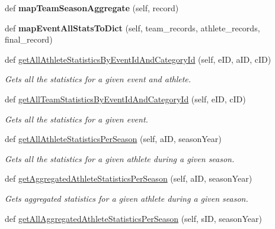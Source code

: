 \begin{DoxyCompactItemize}
def {\bfseries map\+Team\+Season\+Aggregate} (self, record)
\item 
\mbox{\label{classhandler_1_1match__based__event_1_1_match_based_event_handler_a0207233b2c98b5d0b2caffb3b8306700}} 
def {\bfseries map\+Event\+All\+Stats\+To\+Dict} (self, team\+\_\+records, athlete\+\_\+records, final\+\_\+record)
\item 
def \hyperlink{classhandler_1_1match__based__event_1_1_match_based_event_handler_a80e0ef9c6ac143b78ab200c0e84511d9}{get\+All\+Athlete\+Statistics\+By\+Event\+Id\+And\+Category\+Id} (self, e\+ID, a\+ID, c\+ID)
\begin{DoxyCompactList}\small\item\em Gets all the statistics for a given event and athlete. \end{DoxyCompactList}\item 
def \hyperlink{classhandler_1_1match__based__event_1_1_match_based_event_handler_aac09ab67f0980da8a5bda320ff3e4bd9}{get\+All\+Team\+Statistics\+By\+Event\+Id\+And\+Category\+Id} (self, e\+ID, c\+ID)
\begin{DoxyCompactList}\small\item\em Gets all the statistics for a given event. \end{DoxyCompactList}\item 
def \hyperlink{classhandler_1_1match__based__event_1_1_match_based_event_handler_a4405a86c290ca4797357f63e59bbfc44}{get\+All\+Athlete\+Statistics\+Per\+Season} (self, a\+ID, season\+Year)
\begin{DoxyCompactList}\small\item\em Gets all the statistics for a given athlete during a given season. \end{DoxyCompactList}\item 
def \hyperlink{classhandler_1_1match__based__event_1_1_match_based_event_handler_ac3a6e8ecaf44b7859f7190988faf836f}{get\+Aggregated\+Athlete\+Statistics\+Per\+Season} (self, a\+ID, season\+Year)
\begin{DoxyCompactList}\small\item\em Gets aggregated statistics for a given athlete during a given season. \end{DoxyCompactList}\item 
def \hyperlink{classhandler_1_1match__based__event_1_1_match_based_event_handler_ae2ff50d766972ce4dec4c4e10e531873}{get\+All\+Aggregated\+Athlete\+Statistics\+Per\+Season} (self, s\+ID, season\+Year)

\end{DoxyCompactItemize}
